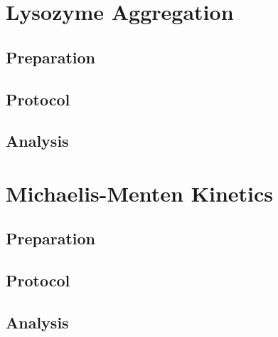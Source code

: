 \documentclass[a4paper,11pt]{article}
\begin{document}
    \section{Lysozyme Aggregation}
        \subsection{Preparation}
        \lipsum[1]
        \subsection{Protocol}
        \lipsum[1]
        \subsection{Analysis}
        \lipsum[1]
    \pagebreak
    
    \section{Michaelis-Menten Kinetics}
        \subsection{Preparation}
        \lipsum[1]
        \subsection{Protocol}
        \lipsum[1]
        \subsection{Analysis}
        \lipsum[1]
    \pagebreak
\end{document}

